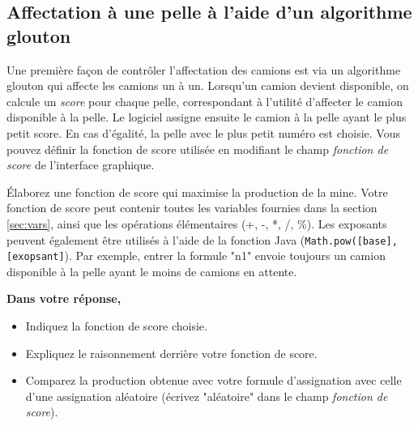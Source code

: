 \subsection{Affectation à une pelle à l'aide d'un algorithme glouton} 
\label{max_prod:score}

Une première façon de contrôler l'affectation des camions est via un algorithme glouton qui affecte les camions un à un. Lorsqu'un camion devient disponible, on calcule un \textit{score} pour chaque pelle, correspondant à l'utilité d'affecter le camion disponible à la pelle. Le logiciel assigne ensuite le camion à la pelle ayant le plus petit score. En cas d'égalité, la pelle avec le plus petit numéro est choisie. Vous pouvez définir la fonction de score utilisée en modifiant le champ \textit{fonction de score} de l'interface graphique. 

Élaborez une fonction de score qui maximise la production de la mine. Votre fonction de score peut contenir toutes les variables fournies dans la section \ref{sec:vars}, ainsi que les opérations élémentaires (+, -, *, /, \%). Les exposants peuvent également être utilisés à l'aide de la fonction Java (\verb!Math.pow([base], [exopsant]!). Par exemple, entrer la formule "n1" envoie toujours un camion disponible à la pelle ayant le moins de camions en attente.

\vspace{10pt} 
\noindent\textbf{Dans votre réponse,}  
\begin{itemize}
	\item Indiquez la fonction de score choisie.
	\item Expliquez le raisonnement derrière votre fonction de score.
	\item Comparez la production obtenue avec votre formule d'assignation avec celle d'une assignation aléatoire (écrivez "aléatoire" dans le champ \textit{fonction de score}).
\end{itemize}


